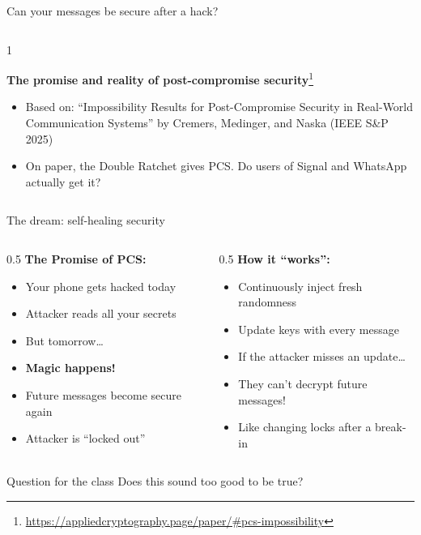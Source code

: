 \ifdefined\PRESENTATION\else\PassOptionsToClass{handout}{beamer}\fi\documentclass[aspectratio=169, lualatex]{beamer}
\begin{document}
\begin{frame}{Can your messages be secure after a hack?}
	\begin{columns}[c]
		\begin{column}{1\textwidth}
			\begin{center}
				\Large \textbf{The promise and reality of post-compromise security}\footnote{\url{https://appliedcryptography.page/paper/\#pcs-impossibility}}
			\end{center}
			\vspace{1em}
			\begin{itemize}
				\item Based on: ``Impossibility Results for Post-Compromise Security in Real-World Communication Systems'' by Cremers, Medinger, and Naska (IEEE S\&P 2025)
				\item On paper, the Double Ratchet gives PCS. Do users of Signal and WhatsApp actually get it?
			\end{itemize}
		\end{column}
	\end{columns}
\end{frame}

\begin{frame}{The dream: self-healing security}
	\begin{columns}[c]
		\begin{column}{0.5\textwidth}
			\textbf{The Promise of PCS:}
			\begin{itemize}
				\item Your phone gets hacked today
				\item Attacker reads all your secrets
				\item But tomorrow\ldots
				\item \textbf{Magic happens!}
				\item Future messages become secure again
				\item Attacker is ``locked out''
			\end{itemize}
		\end{column}
		\begin{column}{0.5\textwidth}
			\textbf{How it ``works'':}
			\begin{itemize}
				\item Continuously inject fresh randomness
				\item Update keys with every message
				\item If the attacker misses an update\ldots
				\item They can't decrypt future messages!
				\item Like changing locks after a break-in
			\end{itemize}
		\end{column}
	\end{columns}
	\begin{alertblock}{Question for the class}
		Does this sound too good to be true?
	\end{alertblock}
\end{frame}
\end{document}
